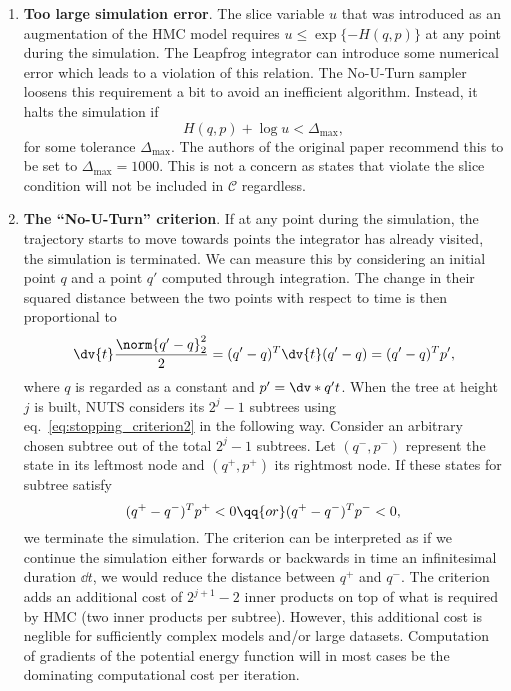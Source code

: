 \begin{enumerate}
    \item \textbf{Too large simulation error}. The slice variable $u$ that was introduced as an augmentation of the HMC model requires $u \leq \exp\{-H(q,p)\}$ at any point during the simulation. The Leapfrog integrator can introduce some numerical error which leads to a violation of this relation. The No-U-Turn sampler loosens this requirement a bit to avoid an inefficient algorithm. Instead, it halts the simulation if
    \begin{equation}\label{eq:stopping_criterion1}
        H(q, p) + \log u < \Delta_\text{max},
    \end{equation} 
    for some tolerance $\Delta_\text{max}$. The authors of the original paper recommend this to be set to $\Delta_\text{max} = 1000$. This is not a concern as states that violate the slice condition will not be included in $\mathcal{C}$ regardless.
    \item \textbf{The ``No-U-Turn'' criterion}. If at any point during the simulation, the trajectory starts to move towards points the integrator has already visited, the simulation is terminated. We can measure this by considering an initial point $q$ and a point $q'$ computed through integration. The change in their squared distance between the two points with respect to time is then proportional to
    \begin{equation}\label{eq:stopping_criterion2}
        \dv{t}\frac{\norm{q' - q}_2^2}{2} = (q' - q)^T \dv{t}  (q' - q) = (q' - q)^Tp',
    \end{equation}
    where $q$ is regarded as a constant and $p' = \dv*{q'}{t}$. When the tree at height $j$ is built, NUTS considers its $2^j - 1$ subtrees using eq.~\eqref{eq:stopping_criterion2} in the following way. Consider an arbitrary chosen subtree out of the total $2^j - 1$ subtrees. Let $(q^-, p^-)$ represent the state in its leftmost node and $(q^+, p^+)$ its rightmost node. If these states for  subtree satisfy
    \begin{equation}\label{eq:stop}
        (q^+ - q^-)^Tp^+ < 0 \qq{or} (q^+ - q^-)^T p^- < 0,
    \end{equation}
    we terminate the simulation. The criterion can be interpreted as if we continue the simulation either forwards or backwards in time an infinitesimal duration $\dd t$, we would reduce the distance between $q^+$ and $q^-$. 
    The criterion adds an additional cost of $2^{j+1} - 2$ inner products on top of what is required by HMC (two inner products per subtree). However, this additional cost is neglible for sufficiently complex models and/or large datasets. Computation of gradients of the potential energy function will in most cases be the dominating computational cost per iteration.   
\end{enumerate}

